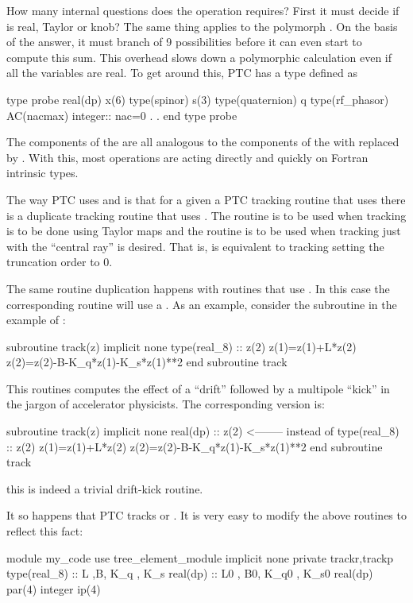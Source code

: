 \documentclass[english,12pt,article]{article} %
\begin{document}
{How many internal questions does the \vn{+} operation requires?   First it must decide if  is real, Taylor or knob?  The same thing applies to the polymorph . On the basis of the answer, it must branch of 9 possibilities before it can even start to compute this sum.   This overhead slows down a polymorphic calculation even if all the variables are real.
To get around this, PTC has a type  defined as
\begin{example}
  type probe
    real(dp) x(6)
    type(spinor) s(3)
    type(quaternion) q
    type(rf_phasor)  AC(nacmax)
    integer:: nac=0
      .
      .
  end type probe
\end{example}
The components of the  are all analogous to the components of the  with  replaced by . With this, most operations are acting directly and quickly on Fortran intrinsic types.

The way PTC uses  and  is that for a given a PTC tracking routine that uses  there is a duplicate tracking routine that uses . The  routine is to be used when tracking is to be done using Taylor maps and the  routine is to be used when tracking just with the ``central ray'' is desired. That is,  is equivalent to tracking setting the truncation order to 0.

The same routine duplication happens with routines that use . In this case the corresponding routine will use a . As an example, consider the subroutine in the example of :
\begin{code}
  subroutine track(z)
  implicit none
  type(real_8) :: z(2) 
  z(1)=z(1)+L*z(2) 
  z(2)=z(2)-B-K_q*z(1)-K_s*z(1)**2 
  end subroutine track
\end{code}

This routines computes the effect of a ``drift'' followed by a multipole ``kick'' in the jargon of accelerator physicists.  The corresponding  version is:
\begin{code}
  subroutine track(z)
  implicit none
  real(dp) :: z(2)            <-------- instead of type(real_8) :: z(2) 
  z(1)=z(1)+L*z(2) 
  z(2)=z(2)-B-K_q*z(1)-K_s*z(1)**2 
  end subroutine track
\end{code}
this is indeed a trivial  drift-kick routine.   
 
    
It so happens that PTC tracks  or  .  It is very easy to modify the above routines to reflect this fact:
\begin{code}
  module my_code
  use tree_element_module
  implicit none
  private trackr,trackp
  type(real_8)  :: L ,B, K_q , K_s 
  real(dp) :: L0 , B0, K_q0 , K_s0 
  real(dp) par(4)
  integer ip(4)
      

\end{code}}
\end{document}
